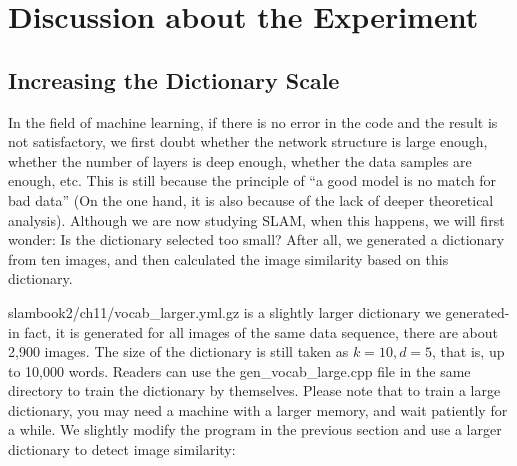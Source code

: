 \section{Discussion about the Experiment}
\subsection{Increasing the Dictionary Scale}
In the field of machine learning, if there is no error in the code and the result is not satisfactory, we first doubt whether the network structure is large enough, whether the number of layers is deep enough, whether the data samples are enough, etc. This is still because the principle of ``a good model is no match for bad data'' (On the one hand, it is also because of the lack of deeper theoretical analysis). Although we are now studying SLAM, when this happens, we will first wonder: Is the dictionary selected too small? After all, we generated a dictionary from ten images, and then calculated the image similarity based on this dictionary.

slambook2/ch11/vocab\_larger.yml.gz is a slightly larger dictionary we generated-in fact, it is generated for all images of the same data sequence, there are about 2,900 images. The size of the dictionary is still taken as $k=10,d=5$, that is, up to 10,000 words. Readers can use the gen\_vocab\_large.cpp file in the same directory to train the dictionary by themselves. Please note that to train a large dictionary, you may need a machine with a larger memory, and wait patiently for a while. We slightly modify the program in the previous section and use a larger dictionary to detect image similarity:



